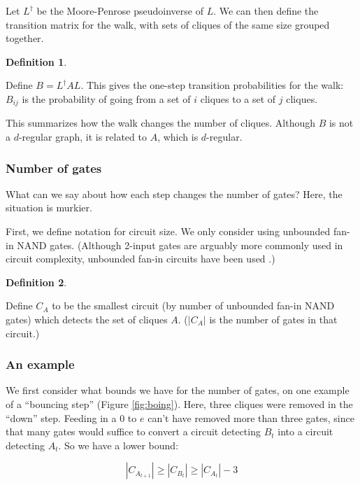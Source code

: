 \documentclass[12pt]{article}
\theoremstyle{definition}
\newtheorem{defn}{Definition}[section]
\begin{document}
Let $L^{\dagger}$ be the Moore-Penrose pseudoinverse of $L$.
We can then define the transition matrix for the walk, with sets of cliques of the same size grouped together.

\begin{defn} \label{defn:B}

Define
$B = L^{\dagger}AL$. This gives the one-step transition probabilities for the walk: $B_{ij}$ is the
probability of going from a set of $i$ cliques to a set of $j$ cliques.

\end{defn}

This summarizes how the walk changes the number of cliques.
Although $B$ is not a $d$-regular graph, it is related to $A$, which is $d$-regular.

\subsubsection{Number of gates}

What can we say about how each step changes the number of gates? Here, the situation is murkier.

First, we define notation for circuit size. 
We only consider using unbounded fan-in NAND gates. (Although
2-input gates are arguably more commonly used in circuit complexity,
unbounded fan-in circuits have been used
\cite{wegener1991complexity}\cite{allender1994depth}.)

\begin{defn} \label{defn:circuitSize}

Define $C_A$ to be the smallest circuit (by number of unbounded fan-in NAND gates)
which detects the set of cliques $A$. ($|C_A|$ is the number of gates in that circuit.)

\end{defn}

\subsubsection{An example}

We first consider what bounds we have for the number of gates,
on one example of a ``bouncing step'' (Figure \ref{fig:boing}).
Here, three cliques were removed in the ``down'' step. Feeding in a 0
to $e$ can't have removed more than three gates, since that many gates would suffice
to convert a circuit detecting $B_t$ into a circuit detecting $A_t$.
So we have a lower bound:

\[
|C_{A_{t+1}}| \ge |C_{B_t}| \ge |C_{A_t}| - 3
\]
\end{document}

